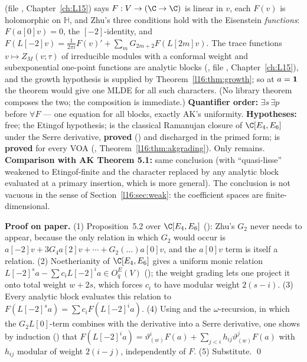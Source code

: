 \begin{dictionary}
 (file ,
Chapter~\ref{ch:L15}) says $F:V\to(\C\to\C)$ is linear in $v$, each $F(v)$ is holomorphic on $\mathbb H$, and Zhu's three
conditions hold with the Eisenstein \emph{functions}: $F(a[0]v)=0$, the $[-2]$-identity, and
$F(L[-2]v) = \frac1{2\pi i}F(v)' + \sum_mG_{2m+2}F(L[2m]v)$. The trace functions $v\mapsto Z_M(v;\tau)$ of irreducible modules with a
conformal weight and subexponential one-point functions are analytic blocks (\allowbreak{}, file
, Chapter~\ref{ch:L15}), and the growth
hypothesis is supplied by Theorem~\ref{l16:thm:growth}; so at $a = \mathbf{1}$ the theorem would give one MLDE for all
such characters. (No library theorem composes the two; the composition is immediate.) \textbf{Quantifier order:} $\exists s\,\exists p$ before $\forall F$ --- one equation
for all blocks, exactly AK's uniformity. \textbf{Hypotheses:}  free;  the Etingof hypothesis;
 is the classical Ramanujan closure of $\C[E_4,E_6]$ under the Serre derivative, \textbf{proved}
() and discharged in the primed form;  is \textbf{proved} for every VOA
(, Theorem~\ref{l16:thm:akgrading}). Only  remains.
\textbf{Comparison with AK Theorem 5.1:} same conclusion (with ``quasi-lisse'' weakened to Etingof-finite and the
character replaced by any analytic block evaluated at a primary insertion, which is more general). The conclusion is
not vacuous in the sense of Section~\ref{l16:sec:weak}: the coefficient spaces are finite-dimensional.
\end{dictionary}

\textbf{Proof on paper.} (1) Proposition~5.2 over $\C[E_4,E_6]$
(\allowbreak{}\allowbreak{}\allowbreak{}\allowbreak{}): Zhu's $G_2$ never needs to appear, because the only
relation in which $G_2$ would occur is $a[-2]v + 3G_4a[2]v+\cdots + G_2(\ldots)a[0]v$, and the $a[0]v$ term is itself a
relation. (2) Noetherianity of $\C[E_4,E_6]$ gives a uniform monic relation
$L[-2]^sa - \sum c_iL[-2]^ia\in O^E_q(V)$ (\allowbreak{}\allowbreak{}\allowbreak{}\allowbreak{}\allowbreak{}); the weight
grading lets one project it onto total weight $w+2s$, which forces $c_i$ to have modular weight $2(s-i)$. (3) Every analytic
block evaluates this relation to $F(L[-2]^sa) = \sum c_iF(L[-2]^ia)$. (4) Using  and the
$\omega$-recursion, in which the $G_2L[0]$-term combines with the derivative into a Serre derivative, one shows by
induction (\allowbreak{}\allowbreak{}) that
$F(L[-2]^ia) = \vartheta^i_{(w)}F(a) + \sum_{j<i}h_{ij}\vartheta^j_{(w)}F(a)$ with $h_{ij}$ modular of weight $2(i-j)$,
independently of $F$. (5) Substitute. \qed

